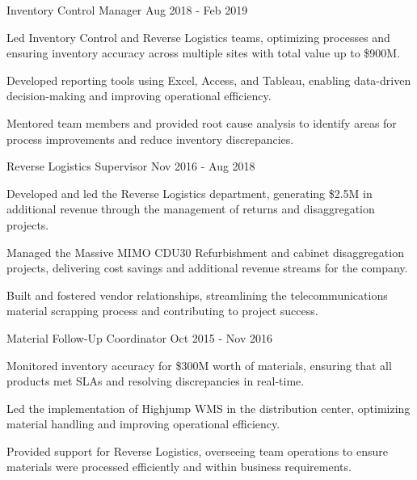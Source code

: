 \begin{cventries}
\cventry
    {Inventory Control Manager} %
    {} %
    {} %
    {Aug 2018 - Feb 2019} %
  {
    \begin{cvitems} %
      \item {Led Inventory Control and Reverse Logistics teams, optimizing processes and ensuring inventory accuracy across multiple sites with total value up to \$900M.}
      \item {Developed reporting tools using Excel, Access, and Tableau, enabling data-driven decision-making and improving operational efficiency.}
      \item {Mentored team members and provided root cause analysis to identify areas for process improvements and reduce inventory discrepancies.}
    \end{cvitems}
  }

\cventry
    {Reverse Logistics Supervisor} %
    {} %
    {} %
    {Nov 2016 - Aug 2018} %
  {
    \begin{cvitems} %
      \item {Developed and led the Reverse Logistics department, generating \$2.5M in additional revenue through the management of returns and disaggregation projects.}
      \item {Managed the Massive MIMO CDU30 Refurbishment and cabinet disaggregation projects, delivering cost savings and additional revenue streams for the company.}
      \item {Built and fostered vendor relationships, streamlining the telecommunications material scrapping process and contributing to project success.}
    \end{cvitems}
  }

\cventry
    {Material Follow-Up Coordinator} %
    {} %
    {} %
    {Oct 2015 - Nov 2016} %
  {
    \begin{cvitems} %
      \item {Monitored inventory accuracy for \$300M worth of materials, ensuring that all products met SLAs and resolving discrepancies in real-time.}
      \item {Led the implementation of Highjump WMS in the distribution center, optimizing material handling and improving operational efficiency.}
      \item {Provided support for Reverse Logistics, overseeing team operations to ensure materials were processed efficiently and within business requirements.}
    \end{cvitems}
  }

\end{cventries}
